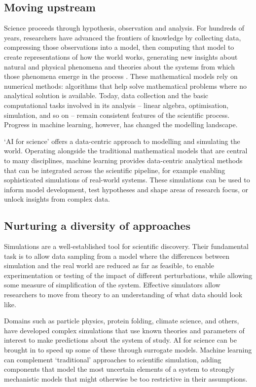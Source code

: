 \subsection{Moving upstream}\label{moving-upstream}

Science proceeds through hypothesis, observation and analysis. For
hundreds of years, researchers have advanced the frontiers of knowledge
by collecting data, compressing those observations into a model, then
computing that model to create representations of how the world works,
generating new insights about natural and physical phenomena and
theories about the systems from which those phenomena emerge in the
process \citep{Blei-build2014}.
These mathematical models rely on numerical methods: algorithms that
help solve mathematical problems where no analytical solution is
available. Today, data collection and the basic computational tasks
involved in its analysis -- linear algebra, optimisation, simulation,
and so on -- remain consistent features of the scientific process.
Progress in machine learning, however, has changed the modelling
landscape.

`AI for science' offers a data-centric approach to modelling and
simulating the world. Operating alongside the traditional mathematical
models that are central to many disciplines, machine learning provides
data-centric analytical methods that can be integrated across the
scientific pipeline, for example enabling sophisticated simulations of
real-world systems. These simulations can be used to inform model
development, test hypotheses and shape areas of research focus, or
unlock insights from complex data.

\subsection{Nurturing a diversity of
approaches}\label{nurturing-a-diversity-of-approaches}

Simulations are a well-established tool for scientific discovery. Their
fundamental task is to allow data sampling from a model where the
differences between simulation and the real world are reduced as far as
feasible, to enable experimentation or testing of the impact of
different perturbations, while allowing some measure of simplification
of the system. Effective simulators allow researchers to move from
theory to an understanding of what data should look like.

Domains such as particle physics, protein folding, climate science, and
others, have developed complex simulations that use known theories and
parameters of interest to make predictions about the system of study. AI
for science can be brought in to speed up some of these through
surrogate models. Machine learning can complement `traditional'
approaches to scientific simulation, adding components that model the
most uncertain elements of a system to strongly mechanistic models that
might otherwise be too restrictive in their assumptions.


